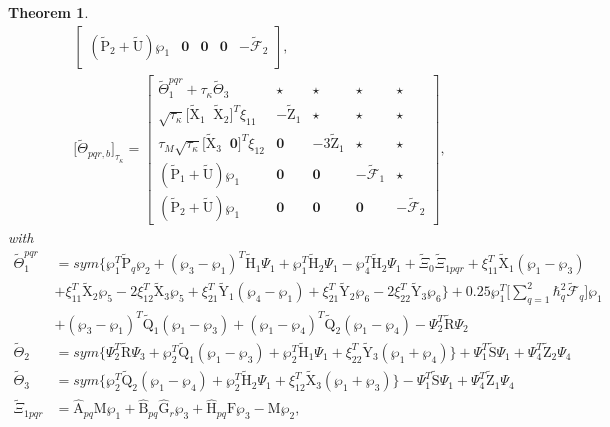 \documentclass[preprint,11pt]{elsarticle}
\newtheorem{Thm}{Theorem}
\begin{document}
\begin{Thm}
\begin{align*}
\begin{bmatrix}
 (\mathrm{\tilde{P}}_2+\mathrm{\tilde{U}})\wp_1&\mathbf{0}&\mathbf{0}&\mathbf{0}&-{\tilde{\mathcal{F}}_2}
 \end{bmatrix},\\
\big[ \tilde{\Theta}_{pqr,b}\big]_{\tau_\kappa}=
 \begin{bmatrix}
 \tilde{\Theta}_1^{pqr}+\tau_\kappa\tilde{\Theta}_3& \star&\star&\star&\star\\
 \sqrt{\tau_\kappa}\big[ \mathrm{\tilde{X}}_1\;\;\mathrm{\tilde{X}}_2 \big]^T\xi_{11}&-\mathrm{\tilde{Z}}_1&\star&\star&\star\\
 \tau_M \sqrt{\tau_\kappa}\big[ \mathrm{\tilde{X}}_3\;\;\mathbf{0} \big]^T\xi_{12}&\mathbf{0}&-3\mathrm{\tilde{Z}}_1&\star&\star\\
 (\mathrm{\tilde{P}}_1+\mathrm{\tilde{U}})\wp_1&\mathbf{0}&\mathbf{0}&-{\tilde{\mathcal{F}}_1}&\star\\
 (\mathrm{\tilde{P}}_2+\mathrm{\tilde{U}})\wp_1&\mathbf{0}&\mathbf{0}&\mathbf{0}&-{\tilde{\mathcal{F}}_2}
 \end{bmatrix},
\end{align*}
with
\begin{align*}
\tilde{\Theta}_1^{pqr}&=sym\big\{\wp^T_1\mathrm{\tilde{P}}_q\wp_2+(\wp_3-\wp_1)^T\mathrm{\tilde{H}}_1\Psi_1+\wp_1^T\mathrm{\tilde{H}}_2\Psi_1
-\wp_4^T\mathrm{\tilde{H}}_2\Psi_1+\tilde{\Xi}_0\tilde{\Xi}_{1pqr}+ \xi_{11}^T \mathrm{\tilde{X}}_1(\wp_1-\wp_3)\\
&+\xi_{11}^T\mathrm{\tilde{X}}_2\wp_5-2\xi_{12}^T\mathrm{\tilde{X}}_3\wp_5
+\xi_{21}^T \mathrm{\tilde{Y}}_1(\wp_4-\wp_1)+\xi_{21}^T\mathrm{\tilde{Y}}_2\wp_6-2\xi_{22}^T\mathrm{\tilde{Y}}_3\wp_6
\big\}+0.25\wp^T_1\Big[ \sum^{2}_{q=1}\hbar_q^2{\tilde{\mathcal{F}}_q}\Big]\wp_1
\\
&+(\wp_3-\wp_1)^T\mathrm{\tilde{Q}}_1(\wp_1-\wp_3)+(\wp_1-\wp_4)^T\mathrm{\tilde{Q}}_2(\wp_1-\wp_4)-\Psi_2^T\mathrm{\tilde{R}}\Psi_2\\
\tilde{\Theta}_2&=sym\Big\{ \Psi_2^T\mathrm{\tilde{R}}\Psi_3+\wp_2^T\mathrm{\tilde{Q}}_1(\wp_1-\wp_3)+\wp_2^T\mathrm{\tilde{H}}_1\Psi_1
+\xi_{22}^T\mathrm{\tilde{Y}}_3(\wp_1+\wp_4) \Big\}+\Psi_1^T\mathrm{\tilde{S}}\Psi_1+\Psi_4^T\mathrm{\tilde{Z}}_2\Psi_4\\
\tilde{\Theta}_3&=sym\Big\{ \wp_2^T\mathrm{\tilde{Q}}_2(\wp_1-\wp_4)+\wp_2^T\mathrm{\tilde{H}}_2\Psi_1
+\xi_{12}^T \mathrm{\tilde{X}}_3(\wp_1+\wp_3) \Big\}-\Psi_1^T\mathrm{\tilde{S}}\Psi_1+\Psi_4^T\mathrm{\tilde{Z}}_1\Psi_4\\
\tilde{\Xi}_{1pqr}&=\mathrm{\widehat{A}}_{pq}\mathrm{M}\wp_1+\mathrm{\hat{B}}_{pq}\mathrm{\widehat{G}}_r\wp_3+\mathrm{\hat{H}}_{pq}\mathrm{F}\wp_3-\mathrm{M}\wp_2,

\end{align*}
\end{Thm}
\end{document}
